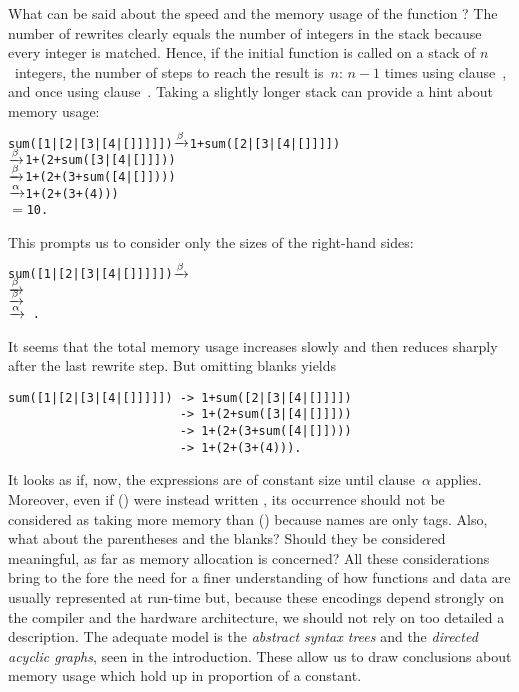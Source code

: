 What can be said about the speed and the memory usage of the function
? The number of rewrites clearly equals the number of
integers in the stack because every integer is matched. Hence, if the
initial function is called on a stack of \(n\)~integers, the number of
steps to reach the result is~\(n\): \(n-1\) times using
clause~\clause{\beta}, and once using clause~\clause{\alpha}. Taking a
slightly longer stack can provide a hint about memory usage:
\begin{alltt}
sum([1|[2|[3|[4|[]]]]]) \(\xrightarrow{\smash[t]{\beta}}\) 1 + sum([2|[3|[4|[]]]])
                        \(\xrightarrow{\smash[t]{\beta}}\) 1 + (2 + sum([3|[4|[]]]))
                        \(\xrightarrow{\smash[t]{\beta}}\) 1 + (2 + (3 + sum([4|[]])))
                        \(\xrightarrow{\smash[t]{\alpha}}\) 1 + (2 + (3 + (4)))
                        \(=\) 10\textrm{.}
\end{alltt}
This prompts us to consider only the sizes of the right\hyp{}hand
sides:
\begin{alltt}
sum([1|[2|[3|[4|[]]]]]) \(\xrightarrow{\smash[t]{\beta}}\) 
                        \(\xrightarrow{\smash[t]{\beta}}\) 
                        \(\xrightarrow{\smash[t]{\beta}}\) 
                        \(\xrightarrow{\smash[t]{\alpha}}\) \,\textrm{.}
\end{alltt}
It seems that the total memory usage increases slowly and then reduces
sharply after the last rewrite step. But omitting blanks yields
\begin{verbatim}
sum([1|[2|[3|[4|[]]]]]) -> 1+sum([2|[3|[4|[]]]])
                        -> 1+(2+sum([3|[4|[]]]))
                        -> 1+(2+(3+sum([4|[]])))
                        -> 1+(2+(3+(4))).
\end{verbatim}
It looks as if, now, the expressions are of constant size until
clause~\(\alpha\) applies. Moreover, even if (\erlcode{+}) were
instead written , its occurrence should not be
considered as taking more memory than (\erlcode{+}) because names are
only tags. Also, what about the parentheses and the blanks? Should
they be considered meaningful, as far as memory allocation is
concerned? All these considerations bring to the fore the need for a
finer understanding of how \Erlang functions and data are usually
represented at run\hyp{}time but, because these encodings depend
strongly on the compiler and the hardware architecture, we should not
rely on too detailed a description. The adequate model is the
\emph{abstract syntax trees} and the \emph{directed acyclic graphs},
seen in the introduction. These allow us to draw conclusions about
memory usage which hold up in proportion of a constant.

